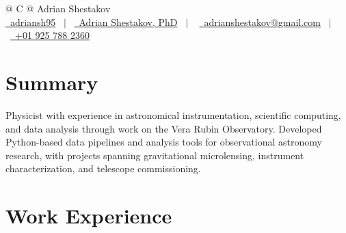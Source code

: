 \documentclass[a4paper,12pt]{article}
\begin{document}
\pagestyle{empty} 



\begin{tabularx}{\linewidth}{@{} C @{}}
\Huge{Adrian Shestakov} \\[7.5pt]
\href{https://github.com/adriansh95}{\raisebox{-0.05\height}\faGithub\ adriansh95} \ $|$ \ 
\href{https://linkedin.com/in/adrian-shestakov-phd-7311b5162}{\raisebox{-0.05\height}\faLinkedin\ Adrian Shestakov, PhD} \ $|$ \ 
\href{mailto:adrianshestakov@gmail.com}{\raisebox{-0.05\height}\faEnvelope \ adrianshestakov@gmail.com} \ $|$ \ 
\href{tel:+9257882360}{\raisebox{-0.05\height}\faMobile \ +01 925 788 2360} \\
\end{tabularx}


\section{Summary}
Physicist with experience in astronomical instrumentation, scientific computing, and data analysis through work on the Vera Rubin Observatory. Developed Python-based data pipelines and analysis tools for observational astronomy research, with projects spanning gravitational microlensing, instrument characterization, and telescope commissioning.


\section{Work Experience}
\end{document}
